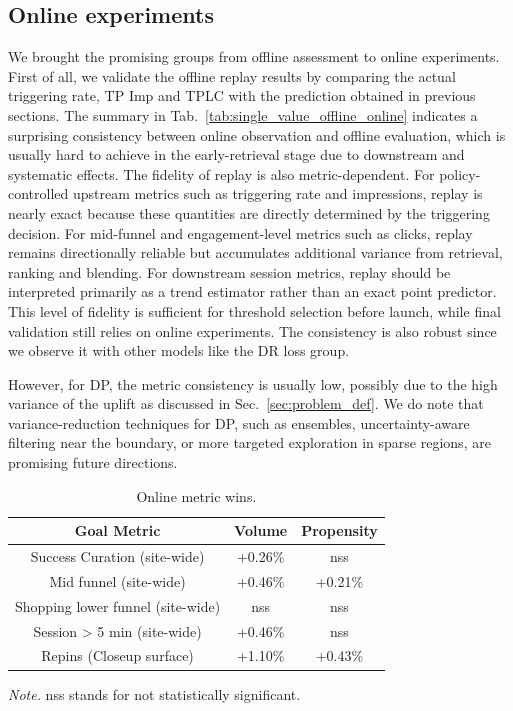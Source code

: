 \documentclass[sigconf, authorversion]{acmart}
\begin{document}
\subsection{Online experiments}
We brought the promising groups from offline assessment to online experiments. First of all, we validate the offline replay results by comparing the actual triggering rate, TP Imp and TPLC with the prediction obtained in previous sections. The summary in Tab.~\ref{tab:single_value_offline_online} indicates a surprising consistency between online observation and offline evaluation, which is usually hard to achieve in the early-retrieval stage due to downstream and systematic effects. The fidelity of replay is also metric-dependent. For policy-controlled upstream metrics such as triggering rate and impressions, replay is nearly exact because these quantities are directly determined by the triggering decision. For mid-funnel and engagement-level metrics such as clicks, replay remains directionally reliable but accumulates additional variance from retrieval, ranking and blending. For downstream session metrics, replay should be interpreted primarily as a trend estimator rather than an exact point predictor. This level of fidelity is sufficient for threshold selection before launch, while final validation still relies on online experiments. The consistency is also robust since we observe it with other models like the DR loss group.

However, for DP, the metric consistency is usually low, possibly due to the high variance of the uplift as discussed in Sec.~\ref{sec:problem_def}. We do note that variance-reduction techniques for DP, such as ensembles, uncertainty-aware filtering near the boundary, or more targeted exploration in sparse regions, are promising future directions.

\begin{table}[h]
  \caption{Online metric wins.}
  \label{tab:online_metrics}
  \begin{tabular}{ccc}
    \toprule
    Goal Metric & Volume & Propensity \\
    \hline
    Success Curation (site-wide) &  +0.26\% & nss \\
    Mid funnel (site-wide) & +0.46\% & +0.21\% \\
    Shopping lower funnel (site-wide) & nss & nss \\
    Session > 5 min (site-wide) & +0.46\% & nss \\
    Repins (Closeup surface) & +1.10\% & +0.43\% \\
    \bottomrule
  \end{tabular}
  
  \vspace{0.5ex}
  {\footnotesize\textit{Note.} nss stands for not statistically significant.\par}
\end{table}
\end{document}

